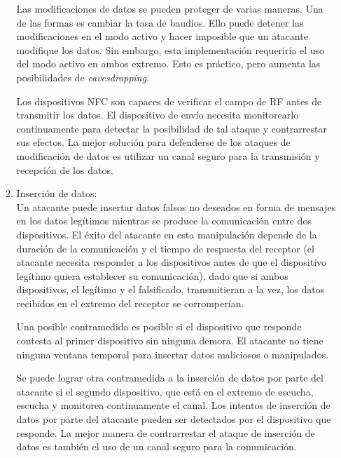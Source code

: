 \documentclass[12pt,a4paper,onecolumn,oneside]{report}
\begin{document}
\begin{enumerate}
\begin{enumerate}
Las modificaciones de datos se pueden proteger de varias maneras. Una de las formas es cambiar la tasa de baudios. Ello puede detener las modificaciones en el modo activo y hacer imposible que un atacante modifique los datos. Sin embargo, esta implementación requeriría el uso del modo activo en ambos extremo. Esto es práctico, pero aumenta las posibilidades de \textit{eavesdropping}.

Los dispositivos NFC son capaces de verificar el campo de RF antes de transmitir los datos. El dispositivo de envío necesita monitorearlo continuamente para detectar la posibilidad de tal ataque y contrarrestar sus efectos. La mejor solución para defenderse de los ataques de modificación de datos es utilizar un canal seguro para la transmisión y recepción de los datos.

\item Inserción de datos:\\
Un atacante puede insertar datos falsos no deseados en forma de mensajes en los datos legítimos mientras se produce la comunicación entre dos dispositivos. El éxito del atacante en esta manipulación depende de la duración de la comunicación y el tiempo de respuesta del receptor (el atacante necesita responder a los dispositivos antes de que el dispositivo legítimo quiera establecer su comunicación), dado que si ambos dispositivos, el legítimo y el falsificado, transmitieran a la vez, los datos recibidos en el extremo del receptor se corromperían. 

Una posible contramedida es posible si el dispositivo que responde contesta al primer dispositivo sin ninguna demora. El atacante no tiene ninguna ventana temporal para insertar datos maliciosos o manipulados. 

Se puede lograr otra contramedida a la inserción de datos por parte del atacante si el segundo dispositivo, que está en el extremo de escucha, escucha y monitorea continuamente el canal. Los intentos de inserción de datos por parte del atacante pueden ser detectados por el dispositivo que responde. La mejor manera de contrarrestar el ataque de inserción de datos es también el uso de un canal seguro para la comunicación.


\end{enumerate}
\end{enumerate}
\end{document}

